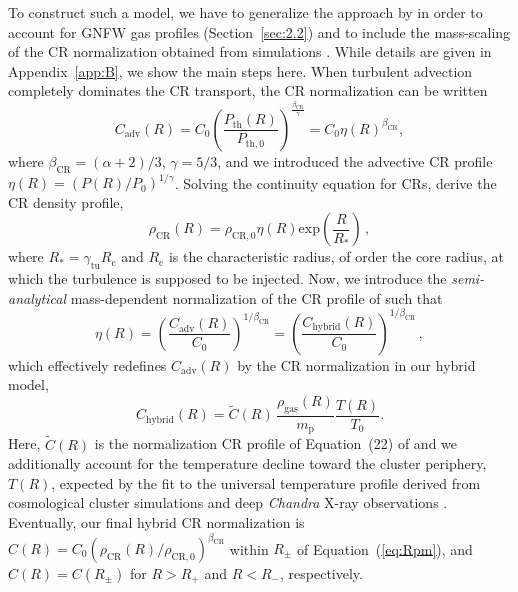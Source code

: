 \documentclass[traditabstract]{aa}
\newcommand{\rmn}{\mathrm}
\begin{document}
To construct such a model, we have to generalize the approach by
\citet{2011A&A...527A..99E} in order to account for GNFW gas profiles
(Section~\ref{sec:2.2}) and to include the mass-scaling of the CR normalization
obtained from simulations \citep{2010MNRAS.409..449P}. While details are given
in Appendix~\ref{app:B}, we show the main steps here. When turbulent advection
completely dominates the CR transport, the CR normalization can be written
\citep{2011A&A...527A..99E}
\begin{equation}
C_{\rmn{adv}}(R)=C_{0} \left( \frac{P_{\rmn{th}}(R)}{P_{\rmn{th},0}} \right)^{\frac{\beta_{\rmn{CR}}}{\gamma}} = 
C_{0} \eta(R)^{\beta_{\rmn{CR}}},
\label{eq:Csimple_1}
\end{equation} 
where $\beta_{\rmn{CR}}=(\alpha+2)/3$, $\gamma=5/3$, and 
we introduced the advective CR profile $\eta(R)=(P(R)/P_0)^{1/\gamma}$. 
Solving the continuity equation for CRs, \citet{2011A&A...527A..99E} derive the CR density profile,
\begin{equation}
\rho_{\rmn{CR}}(R) = \rho_{\rmn{CR},0} \eta(R) \rmn{exp} \left( \frac{R}{R_{*}} \right) \, ,
\label{eg:rhoCR_1}
\end{equation} 
where $R_{*}=\gamma_{\rmn{\rmn{tu}}}R_{\rmn{c}}$ and $R_{\rmn{c}}$ is the characteristic 
radius, of order the core radius, at which the turbulence is supposed to be injected.
Now, we introduce the \emph{semi-analytical} mass-dependent normalization of the
CR profile of \cite{2010MNRAS.409..449P} such that
\begin{equation}
\eta(R) = \left( \frac{C_{\rmn{adv}}(R)}{C_0} \right)^{1/\beta_{\rmn{CR}}} = 
\left( \frac{C_{\rmn{hybrid}}(R)}{C_0} \right)^{1/\beta_{\rmn{CR}}} \, ,
\label{eq:eta}
\end{equation} 
which effectively redefines $C_{\rmn{adv}}(R)$ by the CR normalization in our hybrid model,
\begin{equation}
C_{\rmn{hybrid}}(R) =  \tilde{C}(R)\, \frac{\rho_{\rmn{gas}}(R)}{m_\rmn{p}} \frac{T(R)}{T_0}.
\label{eq:Cf}
\end{equation} 
Here, $\tilde{C}(R)$ is the normalization CR profile of Equation~(22) of
\cite{2010MNRAS.409..449P} and we additionally account for the temperature decline toward
the cluster periphery, $T(R)$, expected by the fit to the universal temperature profile
derived from cosmological cluster simulations
\citep{2007MNRAS.378..385P,2010MNRAS.409..449P} and deep {\em Chandra} X-ray
observations \citep{2005ApJ...628..655V}. Eventually, our final hybrid CR
normalization is $C(R)=C_{0}(\rho_{\rmn{CR}}(R)/\rho_{\rmn{CR},0})^{\beta_{\rmn{CR}}}$
within $R_{\pm}$ of Equation~(\ref{eq:Rpm}), and $C(R) = C(R_{\pm})$ for $R > R_{+}$ 
and $R < R_{-}$, respectively.
\end{document}
